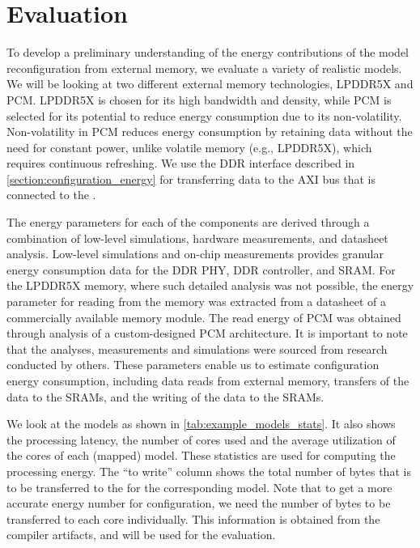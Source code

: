 \section{Evaluation}
To develop a preliminary understanding of the energy contributions of the model reconfiguration from external memory, we evaluate a variety of realistic models.
We will be looking at two different external memory technologies, LPDDR5X and PCM.
LPDDR5X is chosen for its high bandwidth and density, while PCM is selected for its potential to reduce energy consumption due to its non-volatility.
Non-volatility in PCM reduces energy consumption by retaining data without the need for constant power, unlike volatile memory (e.g., LPDDR5X), which requires continuous refreshing.
We use the DDR interface described in \cref{section:configuration_energy} for transferring data to the AXI bus that is connected to the \graicore{}.

The energy parameters for each of the components are derived through a combination of low-level simulations, hardware measurements, and datasheet analysis.
Low-level simulations and on-chip measurements provides granular energy consumption data for the DDR PHY, DDR controller, \confignoc{} and SRAM.
For the LPDDR5X memory, where such detailed analysis was not possible, the energy parameter for reading from the memory was extracted from a datasheet of a commercially available memory module.
The read energy of PCM was obtained through analysis of a custom-designed PCM architecture.
It is important to note that the analyses, measurements and simulations were sourced from research conducted by others.
These parameters enable us to estimate configuration energy consumption, including data reads from external memory, transfers of the data to the SRAMs, and the writing of the data to the SRAMs.

We look at the models as shown in \cref{tab:example_models_stats}.
It also shows the processing latency, the number of cores used and the average utilization of the cores of each (mapped) model.
These statistics are used for computing the processing energy.
The ``to write'' column shows the total number of bytes that is to be transferred to the \graicore{} for the corresponding model.
Note that to get a more accurate energy number for configuration, we need the number of bytes to be transferred to each core individually.
This information is obtained from the compiler artifacts, and will be used for the evaluation.

